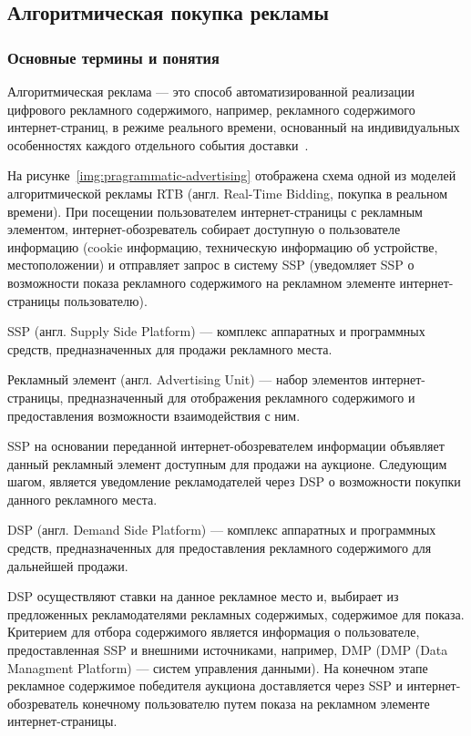 \subsection{Алгоритмическая покупка рекламы}
\subsubsection{Основные термины и понятия}

Алгоритмическая реклама --- это способ автоматизированной реализации цифрового рекламного содержимого,
например, рекламного содержимого интернет-страниц, в режиме реального времени, основанный на индивидуальных 
особенностях каждого отдельного события доставки~\autocite*[]{online:programmatic}.


На рисунке~\ref{img:pragrammatic-advertising} отображена схема одной из моделей алгоритмической рекламы
RTB (англ. Real-Time Bidding, покупка в реальном времени). При посещении пользователем интернет-страницы с рекламным
элементом, интернет-обозреватель собирает доступную о пользователе информацию (cookie информацию, техническую информацию об 
устройстве, местоположении) и отправляет запрос в систему SSP (уведомляет SSP о возможности показа рекламного
содержимого на рекламном элементе интернет-страницы пользователю).

SSP (англ. Supply Side Platform) --- комплекс аппаратных и программных средств, предназначенных для продажи 
рекламного места.

Рекламный элемент (англ. Advertising Unit) --- набор элементов интернет-страницы, предназначенный для 
отображения рекламного содержимого и предоставления возможности взаимодействия с ним.

SSP на основании переданной интернет-обозревателем информации объявляет данный рекламный элемент доступным для 
продажи на аукционе. Следующим шагом, является уведомление рекламодателей через DSP о возможности покупки
данного рекламного места.

DSP (англ. Demand Side Platform) --- комплекс аппаратных и программных средств, предназначенных для предоставления
рекламного содержимого для дальнейшей продажи.

DSP осуществляют ставки на данное рекламное место и, выбирает из предложенных рекламодателями рекламных содержимых,
содержимое для показа. Критерием для отбора содержимого является информация о пользователе, предоставленная
SSP и внешними источниками, например, DMP (DMP (Data Managment Platform) --- систем управления данными). На конечном этапе
рекламное содержимое победителя аукциона доставляется через SSP и интернет-обозреватель конечному пользователю путем 
показа на рекламном элементе интернет-страницы.

